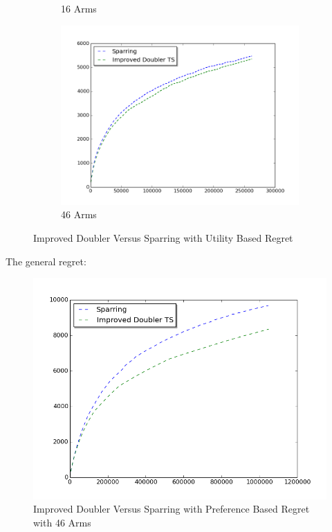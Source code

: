\documentclass{llncs}
\begin{document}
\begin{figure}[h!]
\begin{subfigure}{.5\textwidth}
  \caption{16 Arms}
  \label{fig:sub2}
\end{subfigure}
\begin{subfigure}{.5\textwidth}
  \centering
  \includegraphics[scale=0.3]{figures/improved_doubler_TS_sparring_MQ2007_46arms.png}
  \caption{46 Arms}
  \label{fig:sub2}
\end{subfigure}
\caption{Improved Doubler Versus Sparring with Utility Based Regret}
\label{fig:test}
\end{figure}

The general regret:
\begin{figure}[h!]
  \centering
     \includegraphics[scale=0.4]{figures/improved_doubler_TS_sparring_MQ2007_general.png} 
  \caption{Improved Doubler Versus Sparring with Preference Based Regret with 46 Arms}
\end{figure}
\end{document}

